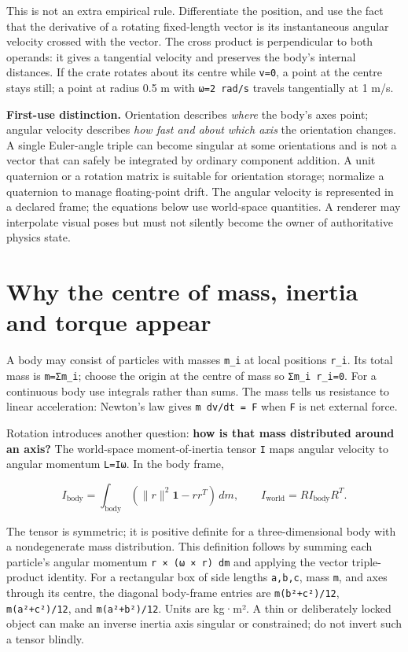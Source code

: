 This is not an extra empirical rule. Differentiate the position, and use the fact that the derivative of a rotating fixed-length vector is its instantaneous angular velocity crossed with the vector. The cross product is perpendicular to both operands: it gives a tangential velocity and preserves the body's internal distances. If the crate rotates about its centre while \texttt{v=0}, a point at the centre stays still; a point at radius 0.5 m with \texttt{\textbar{}ω\textbar{}=2\ rad/s} travels tangentially at 1 m/s.

\textbf{First-use distinction.} Orientation describes \emph{where} the body's axes point; angular velocity describes \emph{how fast and about which axis} the orientation changes. A single Euler-angle triple can become singular at some orientations and is not a vector that can safely be integrated by ordinary component addition. A unit quaternion or a rotation matrix is suitable for orientation storage; normalize a quaternion to manage floating-point drift. The angular velocity is represented in a declared frame; the equations below use world-space quantities. A renderer may interpolate visual poses but must not silently become the owner of authoritative physics state.

\section{Why the centre of mass, inertia and torque appear}\label{02-foundations-ii-ch039-why-the-centre-of-mass-inertia-and-torque-appear}

A body may consist of particles with masses \texttt{m\_i} at local positions \texttt{r\_i}. Its total mass is \texttt{m=Σm\_i}; choose the origin at the centre of mass so \texttt{Σm\_i\ r\_i=0}. For a continuous body use integrals rather than sums. The mass tells us resistance to linear acceleration: Newton's law gives \texttt{m\ dv/dt\ =\ F} when \texttt{F} is net external force.

Rotation introduces another question: \textbf{how is that mass distributed around an axis?} The world-space moment-of-inertia tensor \texttt{I} maps angular velocity to angular momentum \texttt{L=Iω}. In the body frame,

\[
I_{\mathrm{body}}=\int_{\mathrm{body}}(\|r\|^2\mathbf{1}-rr^T)\,dm,
\qquad I_{\mathrm{world}}=R I_{\mathrm{body}}R^T.
\]

The tensor is symmetric; it is positive definite for a three-dimensional body with a nondegenerate mass distribution. This definition follows by summing each particle's angular momentum \texttt{r\ ×\ (ω\ ×\ r)\ dm} and applying the vector triple-product identity. For a rectangular box of side lengths \texttt{a,b,c}, mass \texttt{m}, and axes through its centre, the diagonal body-frame entries are \texttt{m(b²+c²)/12}, \texttt{m(a²+c²)/12}, and \texttt{m(a²+b²)/12}. Units are kg·m². A thin or deliberately locked object can make an inverse inertia axis singular or constrained; do not invert such a tensor blindly.

